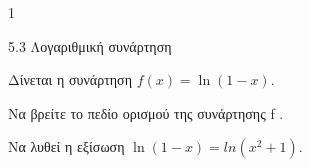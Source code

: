 \begin{ylh}{1}
\item 5.3 Λογαριθμική συνάρτηση
\end{ylh}
Δίνεται η συνάρτηση $f(x) = \ln{(1 - x)}.$
\begin{alist}
\item Να βρείτε το πεδίο ορισμού της συνάρτησης f .
\item Να λυθεί η εξίσωση $\ln(1 - x) = ln(x^{2} + 1).$
\end{alist}

